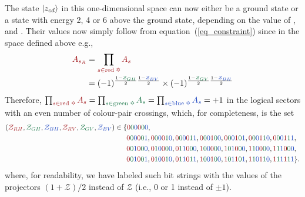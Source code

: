 \documentclass[nofootinbib,pra,twocolumn,showpacs,superscriptaddress,notitlepage,amsmath]{revtex4-2} %
\begin{document}
The state $\ket{z_{cd}}$ in this one-dimensional space can now either be a ground state or a state with energy 2, 4 or 6 above the ground state, depending on the value of ,  and . Their values now simply follow from equation~(\ref{eq_constraint}) since in the space defined above e.g.,
\begin{align}
    \red{A_{s_R}} &= \prod_{\red{s \in \text{red \ding{65}}}} \red{A_s} \nonumber \\
    &= (-1)^{\frac{1-\green{\mathcal{Z}_{GH}}}{2}\frac{1-\blue{\mathcal{Z}_{BV}}}{2}} \times (-1)^{\frac{1-\green{\mathcal{Z}_{GV}}}{2}\frac{1-\blue{\mathcal{Z}_{BH}}}{2}}
\end{align}
Therefore, $\prod_{\red{s \in \text{red \ding{65}}}} \red{A_s} = \prod_{\green{s \in \text{green \ding{65}}}} \green{A_s} = \prod_{\blue{s \in \text{blue \ding{65}}}} \blue{A_s} = +1$ in the logical sectors with an even number of colour-pair crossings, which, for completeness, is the set
\begin{align*}
    (\red{\mathcal{Z}_{RH}}, \green{\mathcal{Z}_{GH}}, \blue{\mathcal{Z}_{BH}}, \red{\mathcal{Z}_{RV}}, \green{\mathcal{Z}_{GV}}, \blue{\mathcal{Z}_{BV}}) &\in \{ \red{0}\green{0}\blue{0}\red{0}\green{0}\blue{0}, \\
    &\quad \,\,\,\,
    \red{0}\green{0}\blue{0}\red{0}\green{0}\blue{1},
    \red{0}\green{0}\blue{0}\red{0}\green{1}\blue{0},
    \red{0}\green{0}\blue{0}\red{0}\green{1}\blue{1},
    \red{0}\green{0}\blue{0}\red{1}\green{0}\blue{0},
    \red{0}\green{0}\blue{0}\red{1}\green{0}\blue{1},
    \red{0}\green{0}\blue{0}\red{1}\green{1}\blue{0},
    \red{0}\green{0}\blue{0}\red{1}\green{1}\blue{1},\\
    &\quad \,\,\,\,
    \red{0}\green{0}\blue{1}\red{0}\green{0}\blue{0},
    \red{0}\green{1}\blue{0}\red{0}\green{0}\blue{0},
    \red{0}\green{1}\blue{1}\red{0}\green{0}\blue{0},
    \red{1}\green{0}\blue{0}\red{0}\green{0}\blue{0},
    \red{1}\green{0}\blue{1}\red{0}\green{0}\blue{0},
    \red{1}\green{1}\blue{0}\red{0}\green{0}\blue{0},
     \red{1}\green{1}\blue{1}\red{0}\green{0}\blue{0},
    \\
    &\quad \,\,\,\,
    \red{0}\green{0}\blue{1}\red{0}\green{0}\blue{1},
    \red{0}\green{1}\blue{0}\red{0}\green{1}\blue{0},
    \red{0}\green{1}\blue{1}\red{0}\green{1}\blue{1},
    \red{1}\green{0}\blue{0}\red{1}\green{0}\blue{0},
    \red{1}\green{0}\blue{1}\red{1}\green{0}\blue{1},
    \red{1}\green{1}\blue{0}\red{1}\green{1}\blue{0},
    \red{1}\green{1}\blue{1}\red{1}\green{1}\blue{1}  \} .
\end{align*}
where, for readability, we have labeled such bit strings with the values of the projectors $(1+\mathcal{Z})/2$ instead of $\mathcal{Z}$ (i.e., 0 or 1 instead of $\pm 1$).
\end{document}
